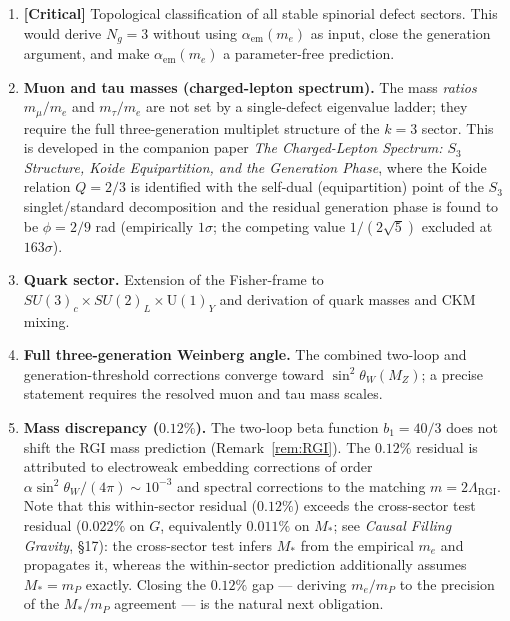 \documentclass[12pt]{article}
\theoremstyle{definition}
\theoremstyle{remark}
\begin{document}
\begin{enumerate}
\item \textbf{[Critical]} Topological classification of all stable spinorial
  defect sectors.  This would derive $N_g=3$ without using
  $\alpha_{\mathrm{em}}(m_e)$ as input, close the generation argument, and
  make $\alpha_{\mathrm{em}}(m_e)$ a parameter-free prediction.

\item \textbf{Muon and tau masses (charged-lepton spectrum).}  The mass
  \emph{ratios} $m_\mu/m_e$ and $m_\tau/m_e$ are not set by a single-defect
  eigenvalue ladder; they require the full three-generation multiplet
  structure of the $k=3$ sector.  This is developed in the companion paper
  \emph{The Charged-Lepton Spectrum: $S_3$ Structure, Koide Equipartition, and
  the Generation Phase}, where the Koide relation $Q=2/3$ is identified with
  the self-dual (equipartition) point of the $S_3$ singlet/standard
  decomposition and the residual generation phase is found to be
  $\phi=2/9$ rad (empirically $1\sigma$; the competing value $1/(2\sqrt5)$
  excluded at $163\sigma$).

\item \textbf{Quark sector.}  Extension of the Fisher-frame to
  $SU(3)_c\times SU(2)_L\times\mathrm{U}(1)_Y$ and derivation of quark
  masses and CKM mixing.

\item \textbf{Full three-generation Weinberg angle.}  The combined two-loop
  and generation-threshold corrections converge toward $\sin^2\theta_W(M_Z)$;
  a precise statement requires the resolved muon and tau mass scales.

\item \textbf{Mass discrepancy ($0.12\%$).}  The two-loop beta function
  $b_1=40/3$ does not shift the RGI mass prediction (Remark~\ref{rem:RGI}).
  The $0.12\%$ residual is attributed to electroweak embedding corrections
  of order $\alpha\sin^2\theta_W/(4\pi)\sim 10^{-3}$ and spectral corrections
  to the matching $m=2\Lambda_{\mathrm{RGI}}$.  Note that this within-sector
  residual ($0.12\%$) exceeds the cross-sector test residual ($0.022\%$ on
  $G$, equivalently $0.011\%$ on $M_*$; see \emph{Causal Filling Gravity},
  \S17): the cross-sector test infers $M_*$ from the empirical $m_e$ and
  propagates it, whereas the within-sector prediction additionally assumes
  $M_*=m_P$ exactly.  Closing the $0.12\%$ gap --- deriving $m_e/m_P$ to the
  precision of the $M_*/m_P$ agreement --- is the natural next obligation.


\end{enumerate}
\end{document}
